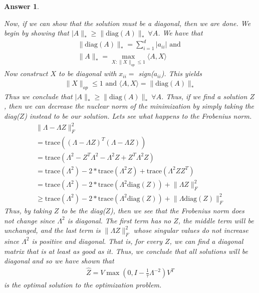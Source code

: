 \documentclass[12pt]{article}
\theoremstyle{colon}
\newtheorem*{answer}{Answer}
\begin{document}
\begin{answer}
\begin{enumerate}[label=\arabic*)]
      Now, if we can show that the solution must be a diagonal, then we are done. We begin by showing that $\lvert A \rVert_* \geq \lVert \text{diag}(A) \rVert_* \ \forall A$. We have that
      \begin{gather*}
        \lVert \text{diag}(A) \rVert_* = \sum_{i=1}^d \lvert a_{ii} \rvert \text{ and } \\
        \lVert A \rVert_* = \max_{X : \lVert X \rVert_{op} \leq 1} \langle A, X \rangle
      \end{gather*}
      Now construct $X$ to be diagonal with $x_{ii} = $ sign($a_{ii}$). This yields
      \begin{gather*}
        \lVert X \rVert_{op} \leq 1 \text{ and } \langle A, X \rangle = \lVert \text{diag}(A) \rVert_*
      \end{gather*}
      Thus we conclude that $\lvert A \rVert_* \geq \lVert \text{diag}(A) \rVert_* \ \forall A$. Thus, if we find a solution $Z$, then we can decrease the nuclear norm of the minimization by simply taking the diag($Z$) instead to be our solution. Lets see what happens to the Frobenius norm.
      \begin{gather*}
        \lVert \Lambda - \Lambda Z \rVert_F^2 \\
        = \text{trace}((\Lambda - \Lambda Z)^T(\Lambda - \Lambda Z)) \\
        = \text{trace}( \Lambda^2 - Z^T \Lambda^2 - \Lambda^2 Z + Z^T \Lambda^2 Z ) \\
        = \text{trace}(\Lambda^2) - 2*\text{trace}(\Lambda^2 Z) + \text{trace}(\Lambda^2 Z Z^T) \\
        = \text{trace}(\Lambda^2) - 2*\text{trace}(\Lambda^2 \text{diag}(Z)) + \lVert \Lambda Z \rVert_F^2 \\
        \geq \text{trace}(\Lambda^2) - 2*\text{trace}(\Lambda^2 \text{diag}(Z)) + \lVert \Lambda \text{diag}(Z) \rVert_F^2
      \end{gather*}
      Thus, by taking $Z$ to be the diag($Z$), then we see that the Frobenius norm does not change since $\Lambda^2$ is diagonal. The first term has no $Z$, the middle term will be unchanged, and the last term is $\lVert \Lambda Z \rVert_F^2$ whose singular values do not increase since $\Lambda^2$ is positive and diagonal. That is, for every $Z$, we can find a diagonal matrix that is at least as good as it. Thus, we conclude that all solutions will be diagonal and so we have shown that
      \begin{gather*}
        \widehat{Z} = V \max (0, I - \frac{1}{\tau} \Lambda^{-2}) V^T
      \end{gather*}
      is the optimal solution to the optimization problem.
  \end{enumerate}
\end{answer}
\end{document}
